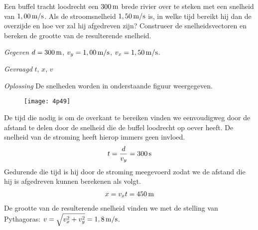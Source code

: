 


\item Een buffel tracht loodrecht een $300\rm\,m$ brede rivier over te steken met een snelheid van $1,00\rm\,m/s$. Als de stroomsnelheid $1,50\rm\,m/s$ is, in welke tijd bereikt hij dan de overzijde en hoe ver zal hij afgedreven zijn? Construeer de snelheidsvectoren en bereken de grootte van de resulterende snelheid.
\begin{oplossing}
\item[\textit{Gegeven}]$d=300\rm\,m$, $v_y=1,00\rm\,m/s$, $v_x=1,50\rm\,m/s$.
\item[\textit{Gevraagd}]$t$, $x$, $v$
\item[\textit{Oplossing}]De snelheden worden in onderstaande figuur weergegeven.
\begin{figure}[h]
\begin{center}
\texttt{[image: 4p49]}
\end{center}
\end{figure}
De tijd die nodig is om de overkant te bereiken vinden we eenvoudigweg door de afstand te delen door de snelheid die de buffel loodrecht op oever heeft. De snelheid van de stroming heeft hierop immers geen invloed.
\begin{eqnarray*}
t=\frac{d}{v_y}=300\rm\,s
\end{eqnarray*}
Gedurende die tijd is hij door de stroming meegevoerd zodat we de afstand die hij is afgedreven kunnen berekenen als volgt.
\begin{eqnarray*}
x=v_xt=450\rm\,m
\end{eqnarray*}
De grootte van de resulterende snelheid vinden we met de stelling van Pythagoras: $v=\sqrt{v_x^2+v_y^2}=1,8\rm\,m/s$.
\end{oplossing}